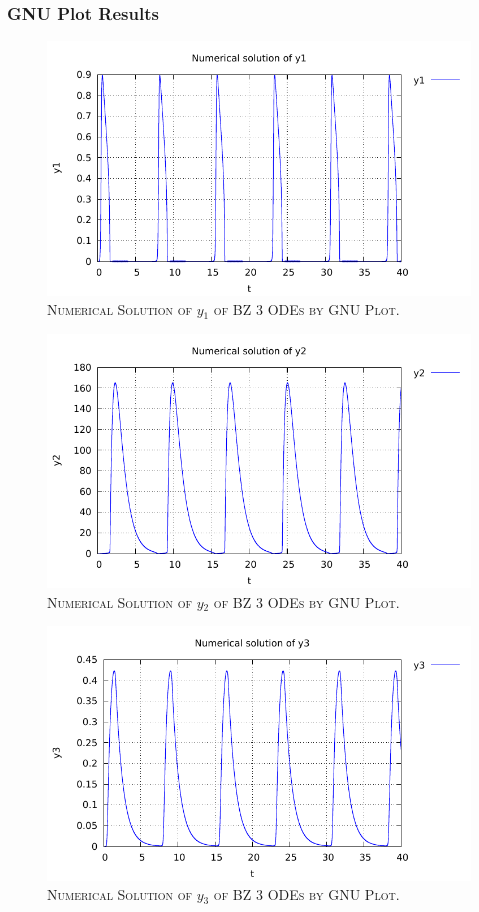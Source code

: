 \documentclass[a4paper,oneside]{book}
\numberwithin{equation}{chapter}
\begin{document}
\subsubsection{GNU Plot Results}
\begin{figure}[H]
\centering
\includegraphics[scale=1.1]{bz3_1}
\caption{\textsc{Numerical Solution of $y_1$ of BZ 3 ODEs by GNU Plot.}}
\end{figure}
\begin{figure}[H]
\centering
\includegraphics[scale=1.1]{bz3_2}
\caption{\textsc{Numerical Solution of $y_2$ of BZ 3 ODEs by GNU Plot.}}
\end{figure}
\begin{figure}[H]
\centering
\includegraphics[scale=1.1]{bz3_3}
\caption{\textsc{Numerical Solution of $y_3$ of BZ 3 ODEs by GNU Plot.}}
\end{figure}
\end{document}
